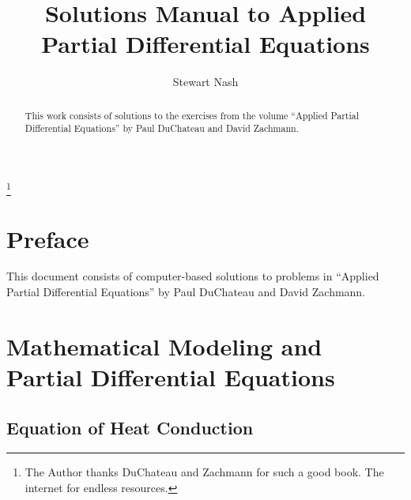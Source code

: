 \documentclass{amsbook}%
\theoremstyle{plain}
\numberwithin{equation}{section}
\begin{document}
\frontmatter
\title[Applied PDE Solutions]{Solutions Manual to Applied Partial Differential Equations}
\author[S. Nash]{Stewart Nash}
\address[S. Nash]{362 Lowell Street%
\hspace*{\fill}\linebreak\indent%
Andover, MA 01810}%
\thanks{The Author thanks DuChateau and Zachmann for such a good book. The internet for endless resources.}

\begin{abstract}
This work consists of solutions to the exercises from the volume ``Applied Partial Differential Equations'' by Paul DuChateau and David Zachmann.
\end{abstract}
\maketitle
\tableofcontents

\chapter*{Preface}

 This document consists of computer-based solutions to problems in ``Applied Partial Differential Equations'' by Paul DuChateau and David Zachmann.

\mainmatter


\chapter{Mathematical Modeling and Partial Differential Equations}

	\section{Equation of Heat Conduction}
\end{document}
